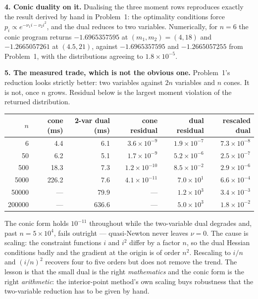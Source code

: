 \documentclass[10pt]{article}
\begin{document}
\textbf{4. Conic duality on it.}
Dualising the three moment rows reproduces exactly the result derived
by hand in Problem~1: the optimality conditions force
$p_i \propto e^{-\nu_1 i - \nu_2 i^2}$, and the dual reduces to two
variables. Numerically, for $n = 6$ the conic program returns
$-1.6965357595$ at $(m_1,m_2) = (4,18)$ and $-1.2665057261$ at
$(4.5,21)$, against $-1.6965357595$ and $-1.2665057255$ from
Problem~1, with the distributions agreeing to $1.8\times10^{-5}$.

\textbf{5. The measured trade, which is not the obvious one.}
Problem~1's reduction looks strictly better: two variables against
$2n$ variables and $n$ cones. It is not, once $n$ grows. Residual below
is the largest moment violation of the returned distribution.

\begin{center}\footnotesize
\setlength{\tabcolsep}{7pt}
\begin{tabular}{@{}rrrrrr@{}}
\toprule
$n$ & cone (ms) & 2-var dual (ms) & cone residual
  & dual residual & rescaled dual\\
\midrule
      6 &   4.4 &   6.1 & $3.6\times10^{-9}$  & $1.9\times10^{-7}$
  & $7.3\times10^{-8}$\\
     50 &   6.2 &   5.1 & $1.7\times10^{-9}$  & $5.2\times10^{-6}$
  & $2.5\times10^{-7}$\\
    500 &  18.3 &   7.3 & $1.2\times10^{-10}$ & $8.5\times10^{-2}$
  & $2.9\times10^{-6}$\\
   5000 & 226.2 &   7.6 & $4.1\times10^{-11}$ & $7.0\times10^{1}$
  & $6.6\times10^{-4}$\\
  50000 & ---   &  79.9 & ---                 & $1.2\times10^{3}$
  & $3.4\times10^{-3}$\\
 200000 & ---   & 636.6 & ---                 & $5.0\times10^{3}$
  & $1.8\times10^{-2}$\\
\bottomrule
\end{tabular}
\end{center}

The conic form holds $10^{-11}$ throughout while the two-variable dual
degrades and, past $n = 5\times10^{4}$, fails outright --- quasi-Newton
never leaves $\nu = 0$. The cause is scaling: the constraint functions
$i$ and $i^2$ differ by a factor $n$, so the dual Hessian conditions
badly and the gradient at the origin is of order $n^2$. Rescaling to
$i/n$ and $(i/n)^2$ recovers four to five orders but does not remove
the trend. The lesson is that the small dual is the right
\emph{mathematics} and the conic form is the right \emph{arithmetic}:
the interior-point method's own scaling buys robustness that the
two-variable reduction has to be given by hand.
\end{document}
